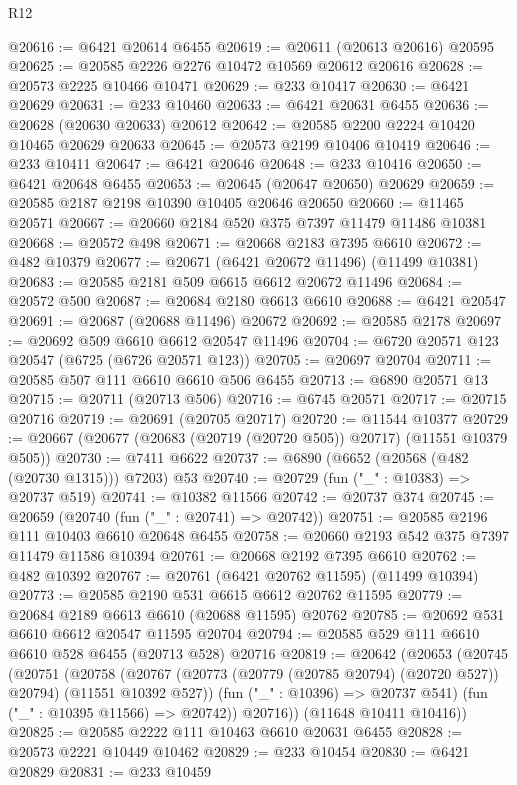 \begin{lexlean}{R12}
\begin{coremodule}
{{{{{{{{{{{{{{{{{{{{{{{{{{{{{{{{{{{{{{{{{{{{{{{{{{{{{{{{{{{{{{{{{{{{{{{{{{{{{{{{{{@20616 := @6421 @20614 @6455
@20619 := @20611 (@20613 @20616) @20595
@20625 := @20585 @2226 @2276 @10472 @10569 @20612 @20616
@20628 := @20573 @2225 @10466 @10471
@20629 := @233 @10417
@20630 := @6421 @20629
@20631 := @233 @10460
@20633 := @6421 @20631 @6455
@20636 := @20628 (@20630 @20633) @20612
@20642 := @20585 @2200 @2224 @10420 @10465 @20629 @20633
@20645 := @20573 @2199 @10406 @10419
@20646 := @233 @10411
@20647 := @6421 @20646
@20648 := @233 @10416
@20650 := @6421 @20648 @6455
@20653 := @20645 (@20647 @20650) @20629
@20659 := @20585 @2187 @2198 @10390 @10405 @20646 @20650
@20660 := @11465 @20571
@20667 := @20660 @2184 @520 @375 @7397 @11479 @11486 @10381
@20668 := @20572 @498
@20671 := @20668 @2183 @7395 @6610
@20672 := @482 @10379
@20677 := @20671 (@6421 @20672 @11496) (@11499 @10381)
@20683 := @20585 @2181 @509 @6615 @6612 @20672 @11496
@20684 := @20572 @500
@20687 := @20684 @2180 @6613 @6610
@20688 := @6421 @20547
@20691 := @20687 (@20688 @11496) @20672
@20692 := @20585 @2178
@20697 := @20692 @509 @6610 @6612 @20547 @11496
@20704 := @6720 @20571 @123 @20547 (@6725 (@6726 @20571 @123))
@20705 := @20697 @20704
@20711 := @20585 @507 @111 @6610 @6610 @506 @6455
@20713 := @6890 @20571 @13
@20715 := @20711 (@20713 @506)
@20716 := @6745 @20571
@20717 := @20715 @20716
@20719 := @20691 (@20705 @20717)
@20720 := @11544 @10377
@20729 := @20667 (@20677 (@20683 (@20719 (@20720 @505)) @20717) (@11551 @10379 @505))
@20730 := @7411 @6622
@20737 := @6890 (@6652 (@20568 (@482 (@20730 @1315))) @7203) @53
@20740 := @20729 (fun ("_" : @10383) => @20737 @519)
@20741 := @10382 @11566
@20742 := @20737 @374
@20745 := @20659 (@20740 (fun ("_" : @20741) => @20742))
@20751 := @20585 @2196 @111 @10403 @6610 @20648 @6455
@20758 := @20660 @2193 @542 @375 @7397 @11479 @11586 @10394
@20761 := @20668 @2192 @7395 @6610
@20762 := @482 @10392
@20767 := @20761 (@6421 @20762 @11595) (@11499 @10394)
@20773 := @20585 @2190 @531 @6615 @6612 @20762 @11595
@20779 := @20684 @2189 @6613 @6610 (@20688 @11595) @20762
@20785 := @20692 @531 @6610 @6612 @20547 @11595 @20704
@20794 := @20585 @529 @111 @6610 @6610 @528 @6455 (@20713 @528) @20716
@20819 := @20642
    (@20653
      (@20745
        (@20751
          (@20758
            (@20767 (@20773 (@20779 (@20785 @20794) (@20720 @527)) @20794) (@11551 @10392 @527))
            (fun ("_" : @10396) => @20737 @541)
            (fun ("_" : @10395 @11566) => @20742))
          @20716))
      (@11648 @10411 @10416))
@20825 := @20585 @2222 @111 @10463 @6610 @20631 @6455
@20828 := @20573 @2221 @10449 @10462
@20829 := @233 @10454
@20830 := @6421 @20829
@20831 := @233 @10459
}}}}}}}}}}}}}}}}}}}}}}}}}}}}}}}}}}}}}}}}}}}}}}}}}}}}}}}}}}}}}}}}}}}}}}}}}}}}}}}}}}
\end{coremodule}
\end{lexlean}
